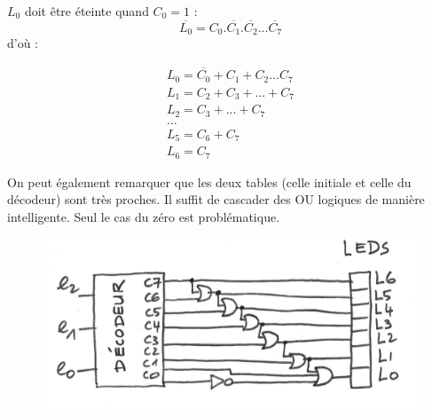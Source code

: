 \documentclass[a4paper,11pt]{article}
\begin{document}
\begin{cadre}
$L_0$ doit être éteinte quand $C_0=1$ :
$$\overline{L_0}=C_0.\overline{C_1}.\overline{C_2}...\overline{C_7}$$ d'où :

\begin{eqnarray}
L_0=\overline{C_0}+C_1+C_2...C_7\\
L_1=C_2+C_3+...+C_7\\
L_2=C_3+...+C_7\\
\dots\\
L_5=C_6+C_7\\
L_6=C_7
\end{eqnarray}

On peut également remarquer que les deux tables (celle initiale et celle du décodeur) sont très proches. Il suffit de cascader des OU logiques de manière intelligente. Seul le cas du zéro est problématique.

\end{cadre}
\begin{figure}[!h]
\begin{center}
\includegraphics[scale=0.3]{./vumetre-2015.png}
\end{center}
\end{figure}
\end{document}

